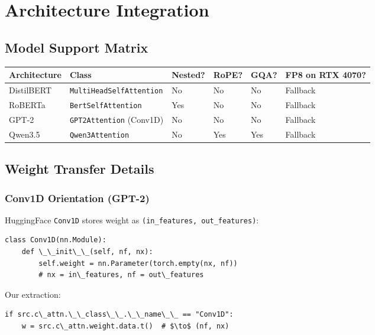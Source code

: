 
\section{Architecture Integration}

\subsection{Model Support Matrix}

\begin{table}[H]
\centering
\small
\begin{tabular}{llllll}
\toprule
\textbf{Architecture} & \textbf{Class} & \textbf{Nested?} & \textbf{RoPE?} & \textbf{GQA?} & \textbf{FP8 on RTX 4070?} \\
\midrule
DistilBERT & \texttt{MultiHeadSelfAttention} & No & No & No & Fallback \\
RoBERTa & \texttt{BertSelfAttention} & Yes & No & No & Fallback \\
GPT-2 & \texttt{GPT2Attention} (Conv1D) & No & No & No & Fallback \\
Qwen3.5 & \texttt{Qwen3Attention} & No & Yes & Yes & Fallback \\
\bottomrule
\end{tabular}
\end{table}

\subsection{Weight Transfer Details}

\subsubsection{Conv1D Orientation (GPT-2)}

HuggingFace \texttt{Conv1D} stores weight as \texttt{(in\_features, out\_features)}:

\begin{lstlisting}
class Conv1D(nn.Module):
    def \_\_init\_\_(self, nf, nx):
        self.weight = nn.Parameter(torch.empty(nx, nf))
        # nx = in\_features, nf = out\_features
\end{lstlisting}

Our extraction:

\begin{lstlisting}
if src.c\_attn.\_\_class\_\_.\_\_name\_\_ == "Conv1D":
    w = src.c\_attn.weight.data.t()  # $\to$ (nf, nx)
\end{lstlisting}

